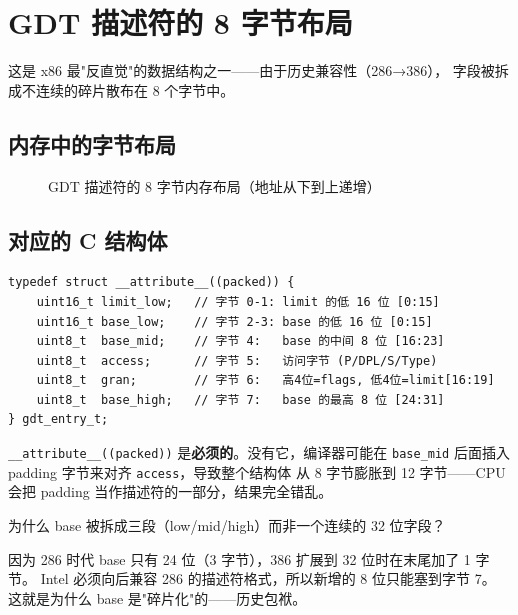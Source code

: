 \section{GDT 描述符的 8 字节布局}

这是 x86 最"反直觉"的数据结构之一——由于历史兼容性（286→386），
字段被拆成不连续的碎片散布在 8 个字节中。

\subsection{内存中的字节布局}

\begin{figure}[H]
  \centering
  
  \caption{GDT 描述符的 8 字节内存布局（地址从下到上递增）}
  \label{fig:gdt-layout}
\end{figure}

\subsection{对应的 C 结构体}

\begin{lstlisting}[style=cstyle]
typedef struct __attribute__((packed)) {
    uint16_t limit_low;   // 字节 0-1: limit 的低 16 位 [0:15]
    uint16_t base_low;    // 字节 2-3: base 的低 16 位 [0:15]
    uint8_t  base_mid;    // 字节 4:   base 的中间 8 位 [16:23]
    uint8_t  access;      // 字节 5:   访问字节 (P/DPL/S/Type)
    uint8_t  gran;        // 字节 6:   高4位=flags, 低4位=limit[16:19]
    uint8_t  base_high;   // 字节 7:   base 的最高 8 位 [24:31]
} gdt_entry_t;
\end{lstlisting}

\begin{warnbox}
\texttt{\_\_attribute\_\_((packed))} 是\textbf{必须的}。没有它，编译器可能在
\texttt{base\_mid} 后面插入 padding 字节来对齐 \texttt{access}，导致整个结构体
从 8 字节膨胀到 12 字节——CPU 会把 padding 当作描述符的一部分，结果完全错乱。
\end{warnbox}

\begin{thinkbox}
为什么 base 被拆成三段（low/mid/high）而非一个连续的 32 位字段？

因为 286 时代 base 只有 24 位（3 字节），386 扩展到 32 位时在末尾加了 1 字节。
Intel 必须向后兼容 286 的描述符格式，所以新增的 8 位只能塞到字节 7。
这就是为什么 base 是"碎片化"的——历史包袱。
\end{thinkbox}

